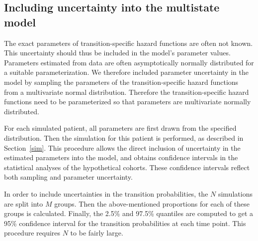 \subsection[Uncertainty]{Including uncertainty into the multistate model}\label{unc}
The exact parameters of transition-specific hazard functions are often not known. This uncertainty should thus be included in the model's parameter values. Parameters estimated from data are often asymptotically normally distributed for a suitable parameterization. We therefore included parameter uncertainty in the model by sampling the parameters of the transition-specific hazard functions from a multivariate normal distribution. Therefore the transition-specific hazard functions need to be parameterized so that parameters are multivariate normally distributed.

For each simulated patient, all parameters are first drawn from the specified distribution. Then the simulation for this patient is performed, as described in Section~\ref{sim}. This procedure allows the direct inclusion of uncertainty in the estimated parameters into the model, and obtains confidence intervals in the statistical analyses of the hypothetical cohorts. These confidence intervals reflect both sampling and parameter uncertainty. 

In order to include uncertainties in the transition probabilities, the $N$ simulations are split into $M$ groups. Then the above-mentioned proportions for each of these groups is calculated. Finally, the 2.5\% and 97.5\% quantiles are computed to get a 95\% confidence interval for the transition probabilities at each time point. This procedure requires $N$ to be fairly large.